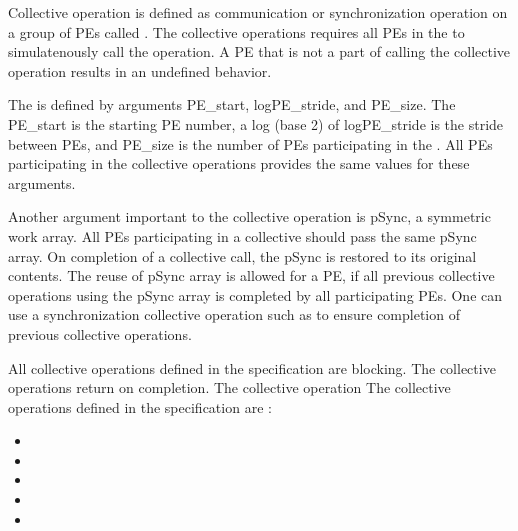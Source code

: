 Collective operation is defined as communication or synchronization operation 
on a group of \ac{PE}s called \activeset{}. The collective operations requires all
\ac{PE}s in the \activeset{} to simulatenously call the operation. 
A \ac{PE} that is not a part of \activeset{} calling the collective 
operation results in an undefined behavior.

The \activeset{} is defined by arguments PE\_start, logPE\_stride, 
and PE\_size. The PE\_start is the starting \ac{PE} number, a log (base 2) of logPE\_stride 
is the stride between \ac{PE}s, and PE\_size is the number of \ac{PE}s 
participating in the \activeset{}. All \ac{PE}s participating in the 
collective operations provides the same values for these arguments. 
 
Another argument important to the collective operation is pSync, a symmetric work 
array. All \ac{PE}s participating in a collective should pass the same
pSync array. On completion of a collective call, the pSync is restored to its 
original contents. The reuse of pSync array is allowed for a \ac{PE}, if all previous collective 
operations using the pSync array is completed by all participating 
\ac{PE}s. One can use a synchronization collective operation such as \barrier{}
to ensure completion of previous collective operations.

All collective operations defined in the specification are blocking. The 
collective operations return on completion. The collective operation 
The collective operations defined in the \openshmem{} specification 
are :

\begin{itemize}
\item[] \broadcast{} 
\item[] \barrier{}
\item[] \barrierall{}
\item[] \collect{}
\item[] \reduction{} 
\end{itemize} 

